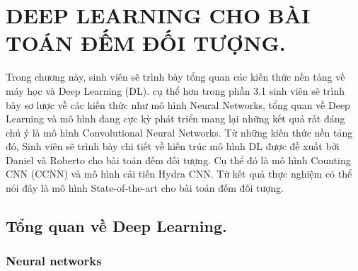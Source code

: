 
\chapter{DEEP LEARNING CHO BÀI TOÁN ĐẾM ĐỐI TƯỢNG.}
\ifpdf
    \graphicspath{{Chapter3/Chapter3Figs/PNG/}{Chapter3/Chapter3Figs/PDF/}{Chapter3/Chapter3Figs/}}
\else
    \graphicspath{{Chapter3/Chapter3Figs/EPS/}{Chapter3/Chapter3Figs/}}
\fi

Trong chương này, sinh viên sẽ trình bày tổng quan các kiến thức nền tảng về máy học và Deep Learning (DL). cụ thể hơn trong phần 3.1 sinh viên sẽ trình bày sơ lược về các kiến thức như mô hình Neural Networks, tổng quan về Deep Learning và mô hình đang cực kỳ phát triển mang lại những kết quả rất đáng chú ý là mô hình Convolutional Neural Networks. Từ những kiến thức nền tảng đó, Sinh viên sẽ trình bày chi tiết về kiến trúc mô hình DL được đề xuất bởi Daniel và Roberto \cite{onoro2016towards} cho bài toán đếm đối tượng. Cụ thể đó là mô hình Counting CNN (CCNN) và mô hình cải tiến Hydra CNN. Từ kết quả thực nghiệm có thể nói đây là mô hình State-of-the-art cho bài toán đếm đối tượng.
\section{Tổng quan về Deep Learning.}
	

\subsection{Neural networks}
